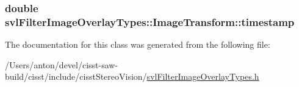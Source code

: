 \subsubsection[{timestamp}]{\setlength{\rightskip}{0pt plus 5cm}double svl\+Filter\+Image\+Overlay\+Types\+::\+Image\+Transform\+::timestamp}\label{classsvl_filter_image_overlay_types_1_1_image_transform_aebc07597fe5d99cf5a2256e87f6f523c}


The documentation for this class was generated from the following file\+:\begin{DoxyCompactItemize}
\item 
/\+Users/anton/devel/cisst-\/saw-\/build/cisst/include/cisst\+Stereo\+Vision/\hyperlink{svl_filter_image_overlay_types_8h}{svl\+Filter\+Image\+Overlay\+Types.\+h}\end{DoxyCompactItemize}
